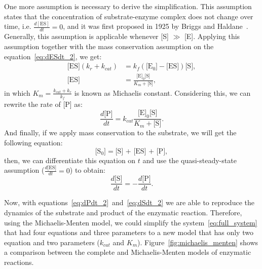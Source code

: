 One more assumption is necessary to derive the simplification. This 
assumption states that the concentration of substrate-enzyme complex
does not change over time, i.e. $\frac{d[\text{ES}]}{dt} = 0$, and it 
was first proposed in 1925 by Briggs and Haldane~\cite{Briggs1925}. 
Generally, this assumption is applicable whenever [S] $\gg$ [E]. 
Applying this assumption together with the mass conservation assumption 
on the equation~\ref{eq:dESdt_2}, we get:
\begin{equation*}  
    \begin{aligned}
        \text{[ES]} (k_r + k_{cat}) &= 
            k_f(\text{[E$_0$]} - \text{[ES]})\text{[S]}, \\
        \text{[ES]} &= \frac{\text{[E]}_0\text{[S]}}{K_m + \text{[S]}}, 
    \end{aligned}
\end{equation*}
in which $K_m = \frac{k_{cat} + k_r}{k_f}$ is known as Michaelis 
constant. Considering this, we can rewrite the rate of [P] as:
\begin{equation}
    \frac{d\text{[P]}}{dt} = k_{cat}\frac{\text{[E]}_0\text{[S]}}
        {K_m + \text{[S]}}.
    \label{eq:dPdt_2}
\end{equation}
And finally, if we apply mass conservation to the substrate, we will get
the following equation:
\begin{equation*}
    \text{[S$_0$]} = \text{[S] + [ES] + [P]},
\end{equation*}
then, we can differentiate this equation on $t$ and use the 
quasi-steady-state assumption ($\frac{d\text{[ES]}}{dt} = 0$) to obtain:
\begin{equation}
    \frac{d\text{[S]}}{dt} = - \frac{d\text{[P]}}{dt}.
    \label{eq:dSdt_2}
\end{equation}

Now, with equations~\ref{eq:dPdt_2}~and~\ref{eq:dSdt_2} we are able to
reproduce the dynamics of the substrate and product of the enzymatic 
reaction. Therefore, using the Michaelis-Menten model, we could simplify 
the system~\ref{eq:full_system} that had four equations and three 
parameters to a new model that has only two equation and two parameters 
($k_{cat}$ and $K_m$). Figure~\ref{fig:michaelis_menten} shows a 
comparison between the complete and Michaelis-Menten models of enzymatic 
reactions.

